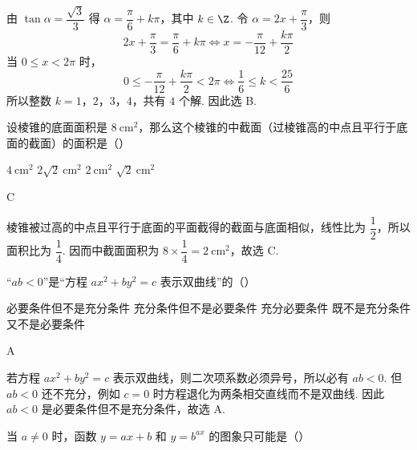 \begin{solution}
由 \(\tan\alpha=\dfrac{\sqrt3}{3}\) 得 \(\alpha=\dfrac{\pi}{6}+k\pi\)，其中 \(k\in\Z\). 令 \(\alpha=2x+\dfrac{\pi}{3}\)，则
\[
2x+\frac{\pi}{3}=\frac{\pi}{6}+k\pi
\iff x=-\frac{\pi}{12}+\frac{k\pi}{2}
\]
当 \(0\leqslant x<2\pi\) 时，
\[
0\leqslant-\frac{\pi}{12}+\frac{k\pi}{2}<2\pi
\iff \frac16\leqslant k<\frac{25}{6}
\]
所以整数 \(k=1\)，\(2\)，\(3\)，\(4\)，共有 \(4\) 个解. 因此选 B.
\end{solution}

\begin{problem}
设棱锥的底面面积是 \(8\mathrm{~cm}^2\)，那么这个棱锥的中截面（过棱锥高的中点且平行于底面的截面）的面积是（\quad）

\choices
    {\(4\mathrm{~cm}^2\)}
    {\(2\sqrt{2}\mathrm{~cm}^2\)}
    {\(2\mathrm{~cm}^2\)}
    {\(\sqrt{2}\mathrm{~cm}^2\)}
\end{problem}

\begin{answer}
C
\end{answer}

\begin{solution}
棱锥被过高的中点且平行于底面的平面截得的截面与底面相似，线性比为 \(\dfrac{1}{2}\)，所以面积比为 \(\dfrac{1}{4}\). 因而中截面面积为 \(8\times\dfrac14=2\mathrm{~cm}^2\)，故选 C.
\end{solution}

\begin{problem}
“\(ab<0\)”是“方程 \(ax^2+by^2=c\) 表示双曲线”的（\quad）

\choices
    {必要条件但不是充分条件}
    {充分条件但不是必要条件}
    {充分必要条件}
    {既不是充分条件又不是必要条件}
\end{problem}

\begin{answer}
A
\end{answer}

\begin{solution}
若方程 \(ax^2+by^2=c\) 表示双曲线，则二次项系数必须异号，所以必有 \(ab<0\). 但 \(ab<0\) 还不充分，例如 \(c=0\) 时方程退化为两条相交直线而不是双曲线. 因此 \(ab<0\) 是必要条件但不是充分条件，故选 A.
\end{solution}

\begin{problem}
当 \(a\neq 0\) 时，函数 \(y=ax+b\) 和 \(y=b^{ax}\) 的图象只可能是（\quad）

    {}
    {}
    {}
\end{problem}

